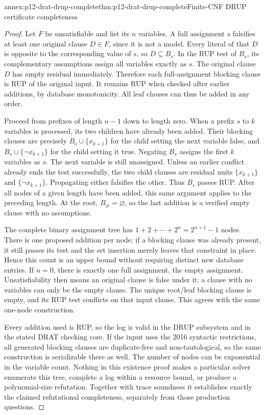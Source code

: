 \begin{annexitem}{annex:p12-drat-drup-complete}{thm:p12-drat-drup-complete}{Finite-CNF DRUP certificate completeness}
\begin{proof}
Let \(F\) be unsatisfiable and list its \(n\) variables.  A full assignment
\(s\) falsifies at least one original clause \(D\in F\), since it is
not a model.  Every literal of that \(D\) is opposite to the corresponding
value of \(s\), so \(D\subseteq B_s\).  In the RUP test of \(B_s\),
its complementary assumptions assign all variables exactly as \(s\).
The original clause \(D\) has empty residual immediately.  Therefore each
full-assignment blocking clause is RUP of the original input.  It remains
RUP when checked after earlier additions, by database monotonicity.  All
leaf clauses can thus be added in any order.

Proceed from prefixes of length \(n-1\) down to length zero.  When a prefix
\(s\) to \(k\) variables is processed, its two children have already
been added.  Their blocking clauses are precisely
\(B_s\cup\{x_{k+1}\}\) for the child setting the next variable false,
and \(B_s\cup\{\neg x_{k+1}\}\) for the child setting it true.
Negating \(B_s\) assigns the first \(k\) variables as \(s\).
The next variable is still unassigned.  Unless an earlier conflict already
ends the test successfully, the two child clauses are residual units
\(\{x_{k+1}\}\) and \(\{\neg x_{k+1}\}\).  Propagating either
falsifies the other.  Thus \(B_s\) passes RUP.  After all nodes of a
given length have been added, this same argument applies to the preceding
length.  At the root, \(B_{\varnothing}=\varnothing\), so the last
addition is a verified empty clause with no assumptions.

The complete binary assignment tree has
\(1+2+\cdots+2^n=2^{n+1}-1\) nodes.  There is one proposed addition per
node; if a blocking clause was already present, it still passes its test and
the set insertion merely leaves that constraint in place.  Hence this count
is an upper bound without requiring distinct new database entries.  If
\(n=0\), there is exactly one full assignment, the empty assignment.
Unsatisfiability then means an original clause is false under it; a clause
with no variables can only be the empty clause.  The unique root/leaf
blocking clause is empty, and its RUP test conflicts on that input clause.
This agrees with the same one-node construction.

Every addition used is RUP, so the log is valid in the DRUP subsystem and in
the stated DRAT checking core.  If the input uses the 2016 syntactic
restrictions, all generated blocking clauses are duplicate-free and
non-tautological, so the same construction is serializable there as well.
The number of nodes can be exponential in the variable count.  Nothing in
this existence proof makes a particular solver enumerate this tree, complete
a log within a resource bound, or produce a polynomial-size refutation.
Together with trace soundness it establishes exactly the claimed
refutational completeness, separately from those production questions.
\end{proof}
\end{annexitem}
